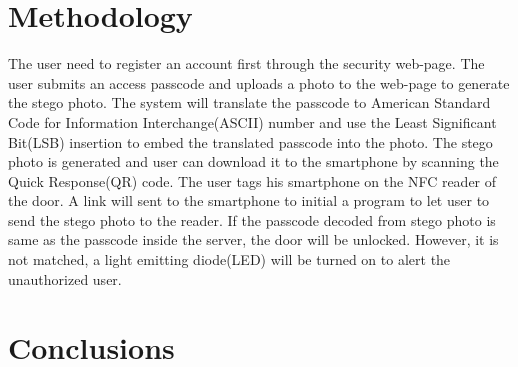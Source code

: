 \documentclass[•]{article}
\begin{document}
\section{Methodology}
The user need to register an account first through the security web-page. The user submits an access passcode and uploads a photo to the web-page to generate the stego photo. The system will translate the passcode to American Standard Code for Information Interchange(ASCII) number and use the Least Significant Bit(LSB) insertion to embed the translated passcode into the photo. The stego photo is generated and user can download it to the smartphone by scanning the Quick Response(QR) code.
The user tags his smartphone on the NFC reader of the door. A link will sent to the smartphone to initial a program to let user to send the stego photo to the reader.
If the passcode decoded from stego photo is same as the passcode inside the server, the door will be unlocked. However, it is not matched, a light emitting diode(LED) will be turned on to alert the unauthorized user.
\section{Conclusions}


{}
\end{document}
